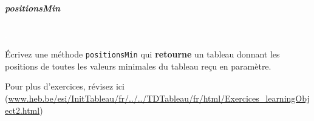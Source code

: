 \documentclass[11pt,a4paper]{article}
\begin{document}
            \par
        
			
		\subparagraph{positionsMin} 
		
					\textcolor{white}{.} \par
				
            \par
        
					\'Ecrivez une m\'ethode
					\verb|positionsMin|
					qui 
					\textbf{retourne}
					un tableau donnant les positions
					de toutes les valeurs minimales
					du tableau re\c cu en param\`etre.
				
            \par
        Pour plus d'exercices, 
          r\'evisez ici (\url{www.heb.be/esi/InitTableau/fr/../../TDTableau/fr/html/Exercices\_learningObject2.html})
            \par
        
				
\end{document}
